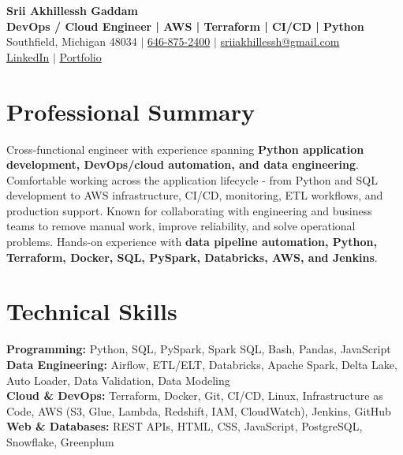 \documentclass[letterpaper,10pt]{article}
\begin{document}
\fontsize{9.35pt}{10.45pt}\selectfont

\begin{center}
    {\LARGE \textbf{Srii Akhillessh Gaddam}} \\[-1pt]
    \textbf{DevOps / Cloud Engineer | AWS | Terraform | CI/CD | Python} \\[2pt]
    Southfield, Michigan 48034 $|$
    \href{tel:6468752400}{646-875-2400} $|$
    \href{mailto:sriiakhillessh@gmail.com}{sriiakhillessh@gmail.com} \\[1pt]
    \href{https://www.linkedin.com/in/srii-akhiilessh-gaddam-b48668191/}{LinkedIn} $|$
    \href{https://sriiakhillesshg.github.io/portfolio/}{Portfolio}
\end{center}
\vspace{-8pt}

\section{Professional Summary}
\small{Cross-functional engineer with experience spanning \textbf{Python application development, DevOps/cloud automation, and data engineering}. Comfortable working across the application lifecycle - from Python and SQL development to AWS infrastructure, CI/CD, monitoring, ETL workflows, and production support. Known for collaborating with engineering and business teams to remove manual work, improve reliability, and solve operational problems. Hands-on experience with \textbf{data pipeline automation, Python, Terraform, Docker, SQL, PySpark, Databricks, AWS, and Jenkins}.}

\section{Technical Skills}
\small{
\textbf{Programming:} Python, SQL, PySpark, Spark SQL, Bash, Pandas, JavaScript \\
\textbf{Data Engineering:} Airflow, ETL/ELT, Databricks, Apache Spark, Delta Lake, Auto Loader, Data Validation, Data Modeling \\
\textbf{Cloud \& DevOps:} Terraform, Docker, Git, CI/CD, Linux, Infrastructure as Code, AWS (S3, Glue, Lambda, Redshift, IAM, CloudWatch), Jenkins, GitHub \\
\textbf{Web \& Databases:} REST APIs, HTML, CSS, JavaScript, PostgreSQL, Snowflake, Greenplum
}
\end{document}
